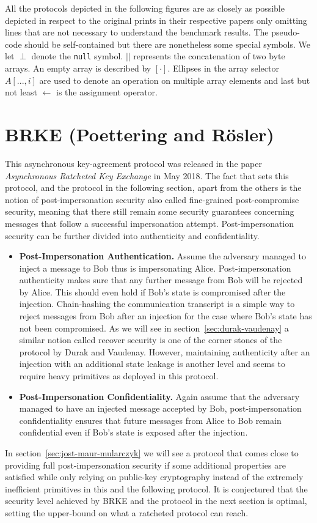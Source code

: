 \documentclass[11pt,a4paper,twoside,openright,bibliography=totoc]{scrbook}
\begin{document}
All the protocols depicted in the following figures are as closely
as possible depicted in respect to the original prints in their respective
papers only omitting lines that are not necessary
to understand the benchmark results. The pseudo-code should be self-contained
but there are nonetheless
some special symbols. We let $\perp$ denote the \texttt{null} symbol.
$||$ represents the concatenation of two byte arrays. An empty
array is described by $[\cdot]$. Ellipses in the array selector
$A[...,i]$ are used to
denote an operation on multiple array elements and last but not least
$\leftarrow$ is the assignment operator.

\section[Poettering and Rösler]
{BRKE (Poettering and Rösler)~\cite{poettering2018towards}}
\label{sec:poettering-roesler}

This asynchronous key-agreement protocol was released in the paper
\textit{Asynchronous Ratcheted Key Exchange} in May 2018.
The fact that sets this protocol, and the protocol in the following
section, apart from the others is the notion of post-impersonation security
also called fine-grained post-compromise security,
meaning that there still remain some security guarantees concerning
messages that follow a successful
impersonation attempt. Post-impersonation security can be further divided
into authenticity and confidentiality.
\begin{itemize}
\item \textbf{Post-Impersonation Authentication.} Assume the adversary
  managed to inject a message to Bob thus is impersonating Alice.
  Post-impersonation authenticity makes sure that any further message
  from Bob will be rejected by Alice. This should even hold if
  Bob's state is compromised after the injection. Chain-hashing
  the communication transcript is a simple way to reject messages from
  Bob after an injection for the case where Bob's state has not
  been compromised. As we will see in section~\ref{sec:durak-vaudenay}
  a similar notion called recover security is one of the corner stones
  of the protocol by Durak and Vaudenay. However, maintaining authenticity
  after an injection with an additional state leakage is another level
  and seems to require heavy primitives as deployed in this protocol.
\item \textbf{Post-Impersonation Confidentiality.} Again assume
  that the adversary managed to have an injected message accepted by Bob,
  post-impersonation confidentiality ensures that future messages from
  Alice to Bob remain
  confidential even if Bob's state is exposed after the injection.
\end{itemize}
In section~\ref{sec:jost-maur-mularczyk} we will see a protocol
that comes close to providing full post-impersonation security
if some additional properties are satisfied while only relying on
public-key cryptography instead of the extremely inefficient
primitives in this and the following protocol. It is conjectured
that the security level achieved by BRKE and the protocol
in the next section is optimal, setting the upper-bound
on what a ratcheted protocol can reach.
\end{document}
